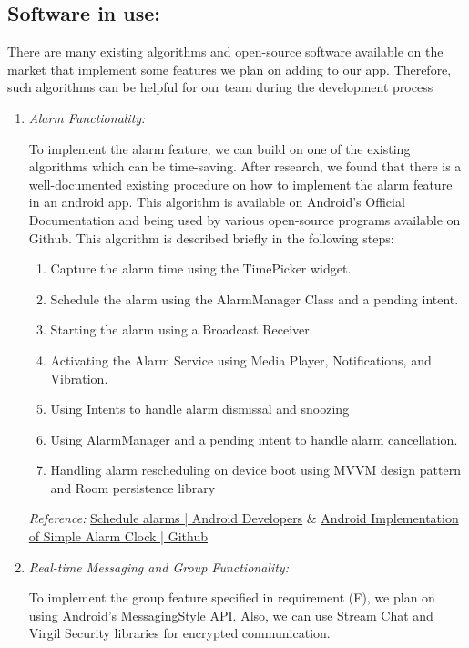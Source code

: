 \documentclass[conference]{IEEEtran}
\begin{document}
\subsection{Software in use:}
There are many existing algorithms and open-source software available on the market that implement some features we plan on adding to our app. Therefore, such algorithms can be helpful for our team during the development process\\
\begin{enumerate}
    \item \textit{Alarm Functionality:}\par
    To implement the alarm feature, we can build on one of the existing algorithms which can be time-saving. After research, we found that there is a well-documented existing procedure on how to implement the alarm feature in an android app. This algorithm is available on Android’s Official Documentation and being used by various open-source programs available on Github. This algorithm is described briefly in the following steps:
    \begin{enumerate}
        \item Capture the alarm time using the TimePicker widget.
        \item Schedule the alarm using the AlarmManager Class and a pending intent.
        \item Starting the alarm using a Broadcast Receiver.
        \item Activating the Alarm Service using Media Player, Notifications, and Vibration.
        \item Using Intents to handle alarm dismissal and snoozing
        \item Using AlarmManager and a pending intent to handle alarm cancellation.
        \item Handling alarm rescheduling on device boot using MVVM design pattern and Room persistence library
    \end{enumerate}
   
   \textit{Reference:} \href{https://developer.android.com/training/scheduling/alarms} {Schedule alarms | Android Developers} \&  \href{https://github.com/learntodroid/SimpleAlarmClock}{Android Implementation of Simple Alarm Clock | Github}\\
   
   \item \textit{Real-time Messaging and Group Functionality:}\par
   To implement the group feature specified in requirement (F), we plan on using Android’s MessagingStyle API. Also, we can use Stream Chat and Virgil Security libraries for encrypted communication.\\
   

\end{enumerate}
\end{document}
